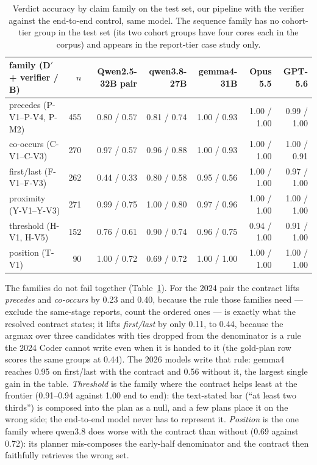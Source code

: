 \begin{table}[t]
\centering
\small
\setlength{\tabcolsep}{5pt}
\begin{tabular}{lrrrrrr}
\toprule
family (D$'$ + verifier / B) & $n$ & Qwen2.5-32B pair & qwen3.8-27B & gemma4-31B & Opus 5.5 & GPT-5.6 \\
\midrule
precedes (P-V1--P-V4, P-M2) & 455 & 0.80 / 0.57 & 0.81 / 0.74 & 1.00 / 0.93 & 1.00 / 1.00 & 0.99 / 1.00 \\
co-occurs (C-V1--C-V3) & 270 & 0.97 / 0.57 & 0.96 / 0.88 & 1.00 / 0.93 & 1.00 / 1.00 & 1.00 / 0.91 \\
first/last (F-V1--F-V3) & 262 & 0.44 / 0.33 & 0.80 / 0.58 & 0.95 / 0.56 & 1.00 / 1.00 & 0.97 / 1.00 \\
proximity (Y-V1--Y-V3) & 271 & 0.99 / 0.75 & 1.00 / 0.80 & 0.97 / 0.96 & 1.00 / 1.00 & 1.00 / 1.00 \\
threshold (H-V1, H-V5) & 152 & 0.76 / 0.61 & 0.90 / 0.74 & 0.96 / 0.75 & 0.94 / 1.00 & 0.91 / 1.00 \\
position (T-V1) & 90 & 1.00 / 0.72 & 0.69 / 0.72 & 1.00 / 1.00 & 1.00 / 1.00 & 1.00 / 1.00 \\
\bottomrule
\end{tabular}
\caption{Verdict accuracy by claim family on the test set, our pipeline with
the verifier against the end-to-end control, same model. The sequence family
has no cohort-tier group in the test set (its two cohort groups have four
cores each in the corpus) and appears in the report-tier case study only.}
\label{tab:families}
\end{table}

The families do not fail together (Table~\ref{tab:families}). For the 2024
pair the contract lifts \emph{precedes} and \emph{co-occurs} by 0.23 and 0.40,
because the rule those families need --- exclude the same-stage reports, count
the ordered ones --- is exactly what the resolved contract states; it lifts
\emph{first/last} by only 0.11, to 0.44, because the argmax over three
candidates with ties dropped from the denominator is a rule the 2024 Coder
cannot write even when it is handed to it (the gold-plan row scores the same
groups at 0.44). The 2026 models write that rule: gemma4 reaches 0.95 on
first/last with the contract and 0.56 without it, the largest single gain in
the table. \emph{Threshold} is the family where the contract helps least at the
frontier (0.91--0.94 against 1.00 end to end): the text-stated bar
(``at least two thirds'') is composed into the plan as a null, and a few plans
place it on the wrong side; the end-to-end model never has to represent it.
\emph{Position} is the one family where qwen3.8 does worse with the contract
than without (0.69 against 0.72): its planner mis-composes the early-half
denominator and the contract then faithfully retrieves the wrong set.

